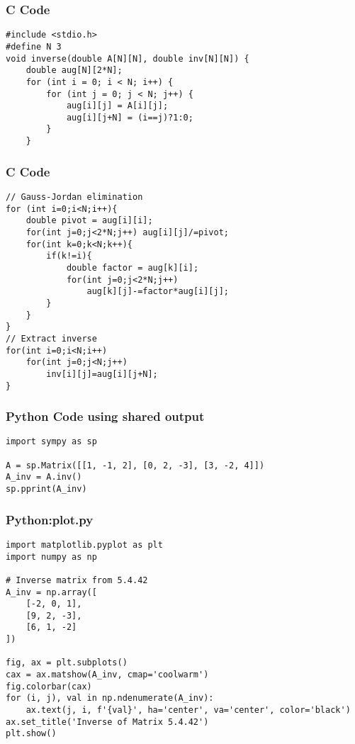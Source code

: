 \documentclass{beamer}
\begin{document}
\begin{frame}[fragile]
\frametitle{C Code }
\begin{lstlisting}
#include <stdio.h>
#define N 3
void inverse(double A[N][N], double inv[N][N]) {
	double aug[N][2*N];
	for (int i = 0; i < N; i++) {
		for (int j = 0; j < N; j++) {
			aug[i][j] = A[i][j];
			aug[i][j+N] = (i==j)?1:0;
		}
	}
\end{lstlisting}
\end{frame}

\begin{frame}[fragile]
\frametitle{C Code}
\begin{lstlisting}
// Gauss-Jordan elimination
for (int i=0;i<N;i++){
	double pivot = aug[i][i];
	for(int j=0;j<2*N;j++) aug[i][j]/=pivot;
	for(int k=0;k<N;k++){
		if(k!=i){
			double factor = aug[k][i];
			for(int j=0;j<2*N;j++)
				aug[k][j]-=factor*aug[i][j];
		}
	}
}
// Extract inverse
for(int i=0;i<N;i++)
	for(int j=0;j<N;j++)
		inv[i][j]=aug[i][j+N];
}
\end{lstlisting}
\end{frame}

\begin{frame}[fragile]
\frametitle{Python Code using shared output}
\begin{lstlisting}
import sympy as sp

A = sp.Matrix([[1, -1, 2], [0, 2, -3], [3, -2, 4]])
A_inv = A.inv()
sp.pprint(A_inv)
\end{lstlisting}
\end{frame}

\begin{frame}[fragile]
\frametitle{Python:plot.py}
\begin{lstlisting}
import matplotlib.pyplot as plt
import numpy as np

# Inverse matrix from 5.4.42
A_inv = np.array([
    [-2, 0, 1],
    [9, 2, -3],
    [6, 1, -2]
])

fig, ax = plt.subplots()
cax = ax.matshow(A_inv, cmap='coolwarm')
fig.colorbar(cax)
for (i, j), val in np.ndenumerate(A_inv):
    ax.text(j, i, f'{val}', ha='center', va='center', color='black')
ax.set_title('Inverse of Matrix 5.4.42')
plt.show()

\end{lstlisting}
\end{frame}
\end{document}
